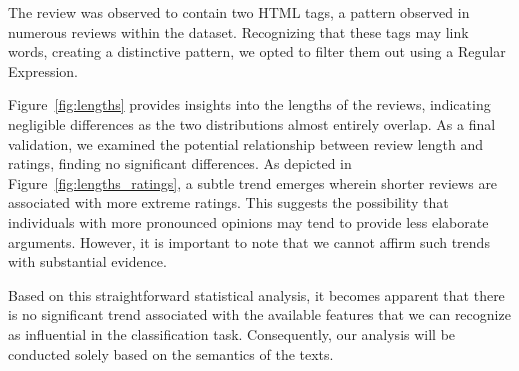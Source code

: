 The review was observed to contain two HTML tags, a pattern observed in numerous reviews within the dataset. Recognizing that these tags may link words, creating a distinctive pattern, we opted to filter them out using a Regular Expression.

Figure~\ref{fig:lengths} provides insights into the lengths of the reviews, indicating negligible differences as the two distributions almost entirely overlap. As a final validation, we examined the potential relationship between review length and ratings, finding no significant differences. As depicted in Figure~\ref{fig:lengths_ratings}, a subtle trend emerges wherein shorter reviews are associated with more extreme ratings. This suggests the possibility that individuals with more pronounced opinions may tend to provide less elaborate arguments. However, it is important to note that we cannot affirm such trends with substantial evidence.

Based on this straightforward statistical analysis, it becomes apparent that there is no significant trend associated with the available features that we can recognize as influential in the classification task. Consequently, our analysis will be conducted solely based on the semantics of the texts.





